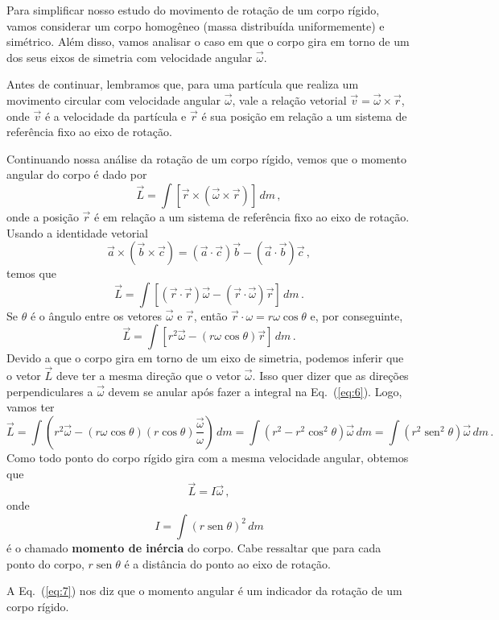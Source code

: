 \documentclass[12pt,a4paper]{article}
\newcommand{\dpar}[1]{\left(#1\right)}
\theoremstyle{definition}
\DeclareMathOperator{\sen}{sen}
\begin{document}
Para simplificar nosso estudo do movimento de rotação de um corpo
rígido, vamos considerar um corpo homogêneo (massa distribuída
uniformemente) e simétrico. Além disso, vamos analisar o caso em que o
corpo gira em torno de um dos seus eixos de simetria com velocidade
angular $\vec\omega$.

Antes de continuar, lembramos que, para uma partícula que realiza um
movimento circular com velocidade angular $\vec\omega$, vale a relação
vetorial $\vec v=\vec\omega\times\vec r$, onde $\vec v$ é a velocidade
da partícula e $\vec r$ é sua posição em relação a um sistema de
referência fixo ao eixo de rotação.

Continuando nossa análise da rotação de um corpo rígido, vemos que o
momento angular do corpo é dado por
$$\vec L=\int [\vec r\times(\vec\omega\times\vec r)]\,dm\,,$$
onde a posição $\vec r$ é em relação a um sistema de referência fixo
ao eixo de rotação.  Usando a identidade vetorial
$$\vec a\times(\vec b\times\vec c)=(\vec a\cdot\vec c)\vec b-(\vec a\cdot\vec b)\vec c\,,$$
temos que
\begin{equation}
  \label{eq:6}
  \vec L=\int [(\vec r\cdot\vec r)\vec\omega-(\vec r\cdot\vec\omega)\vec r]\,dm\,.
\end{equation}
Se $\theta$ é o ângulo entre os vetores $\vec\omega$ e $\vec r$, então
$\vec r\cdot\omega=r\omega\cos\theta$ e, por conseguinte,
$$\vec L=\int [r^2\vec\omega-(r\omega\cos\theta)\vec r]\,dm\,.$$
Devido a que o corpo gira em torno de um eixo de simetria, podemos
inferir que o vetor $\vec L$ deve ter a mesma direção que o vetor
$\vec\omega$. Isso quer dizer que as direções perpendiculares a
$\vec\omega$ devem se anular após fazer a integral na
Eq.~(\ref{eq:6}). Logo, vamos ter
$$\vec L=\int \dpar{r^2\vec\omega-(r\omega\cos\theta)(r\cos\theta)\frac{\vec\omega}{\omega}}\,dm=\int (r^2-r^2\cos^2\theta)\vec\omega\,dm=\int (r^2\sen^2\theta)\vec\omega\,dm\,.$$
Como todo ponto do corpo rígido gira com a mesma velocidade angular,
obtemos que
\begin{equation}
  \label{eq:7}
  \vec L=I\vec\omega\,,
\end{equation}
onde
\begin{equation}
  \label{eq:8}
  I=\int (r\sen\theta)^2\,dm
\end{equation}
é o chamado \textbf{momento de inércia} do corpo. Cabe ressaltar que
para cada ponto do corpo, $r\sen\theta$ é a distância do ponto ao eixo
de rotação.

A Eq.~(\ref{eq:7}) nos diz que o momento angular é um indicador da
rotação de um corpo rígido.
\end{document}
